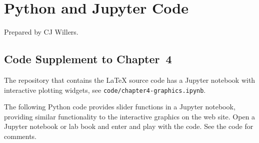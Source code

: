
\chapter{Python and Jupyter Code}
\label{sec:PythonandJupyterCode}

Prepared by CJ Willers.


\section{Code Supplement to Chapter~4}
\label{sec:CodeSupplementtoChapter4}

The repository that contains the \LaTeX{} source code has a Jupyter notebook with interactive plotting widgets, see \lstinline{code/chapter4-graphics.ipynb}.


The following Python code provides slider functions in a Jupyter notebook, providing similar functionality to the interactive graphics on the web site.  Open a Jupyter notebook or lab book and enter and play with the code.  See the code for comments.

